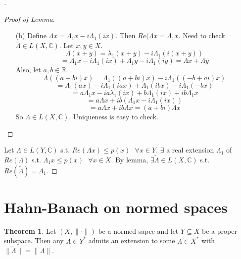 \documentclass{article}
\theoremstyle{definition}
\newtheorem{thm}{Theorem}
\newenvironment{proofs}[1][\proofname]{%
  \begin{proof}[#1]$ $\par\nobreak\ignorespaces
}{%
  \end{proof}
}
\newcommand{\sfa}{\text{  } \forall}
\begin{document}
\begin{proofs}
\begin{proofs}[Proof of Lemma]
\begin{enumerate}
				\item[(b)] Define $\Lambda x = \Lambda_1 x - i \Lambda_1 (ix)$.
					Then $Re(\Lambda x = \Lambda_1 x$.
					Need to check $\Lambda \in L(X, \mathbb{C})$. 
					Let $x, y \in X$. 
					\[
						\Lambda(x + y) = \lambda_1(x + y) - i \Lambda_1(i(x + y))
					\]
					\[
						 = \Lambda_1 x - i \Lambda_1(ix) + \Lambda_1 y - i \Lambda_1 (iy) = \Lambda x + \Lambda y
					 \]
					Also, let $a, b \in \mathbb{R}$.
					\[
						\Lambda((a + bi) x) = \Lambda_1((a + bi)x) - i \Lambda_1((-b + ai) x)
					\]
					\[
						= \Lambda_1(ax) - i \Lambda_1(iax) + \Lambda_1(ibx) - i \Lambda_1(-bx)
					\]
					\[
						= a \Lambda_1 x - i a \lambda_1(ix) + b \Lambda_1(ix) + ib \Lambda_1 x
					\]
					\[
						= a \Lambda x + ib(\Lambda_1 x - i \Lambda_1 (ix))
					\]
					\[
						= a \Lambda x + ib \Lambda x = (a + bi) \Lambda x
					\]
					So $\Lambda \in L(X, \mathbb{C})$.
					Uniqueness is easy to check.
					
			\end{enumerate}
		\end{proofs}
		Let $\Lambda \in L(Y, \mathbb{C})$ s.t. $Re(\Lambda x) \leq p(x) \sfa x \in Y$.
		$\exists$ a real extension $\Lambda_1$ of $Re(\Lambda)$ s.t. $\Lambda_1 x \leq p(x) \sfa x \in X$.
		By lemma, $\exists \tilde{\Lambda} \in L(X, \mathbb{C})$ s.t. $Re(\tilde{\Lambda}) = \Lambda_1$.
\end{proofs}

\section{Hahn-Banach on normed spaces}

\begin{thm}
	Let $(X, \|\cdot \|)$ be a normed sapce and let $Y \subseteq X$ be a proper subspace. 
	Then any $\Lambda \in Y^*$ admits an extension to some $\tilde{\Lambda} \in X^*$ with $\| \tilde{\Lambda} \| = \|\Lambda \|$.
\end{thm}
\end{document}
